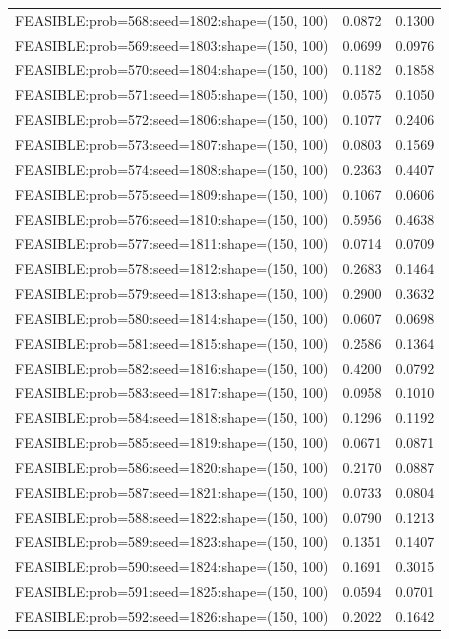 \begin{longtable}{lcc}
FEASIBLE:prob=568:seed=1802:shape=(150, 100) &   0.0872 & 0.1300 \\
FEASIBLE:prob=569:seed=1803:shape=(150, 100) &   0.0699 & 0.0976 \\
FEASIBLE:prob=570:seed=1804:shape=(150, 100) &   0.1182 & 0.1858 \\
FEASIBLE:prob=571:seed=1805:shape=(150, 100) &   0.0575 & 0.1050 \\
FEASIBLE:prob=572:seed=1806:shape=(150, 100) &   0.1077 & 0.2406 \\
FEASIBLE:prob=573:seed=1807:shape=(150, 100) &   0.0803 & 0.1569 \\
FEASIBLE:prob=574:seed=1808:shape=(150, 100) &   0.2363 & 0.4407 \\
FEASIBLE:prob=575:seed=1809:shape=(150, 100) &   0.1067 & 0.0606 \\
FEASIBLE:prob=576:seed=1810:shape=(150, 100) &   0.5956 & 0.4638 \\
FEASIBLE:prob=577:seed=1811:shape=(150, 100) &   0.0714 & 0.0709 \\
FEASIBLE:prob=578:seed=1812:shape=(150, 100) &   0.2683 & 0.1464 \\
FEASIBLE:prob=579:seed=1813:shape=(150, 100) &   0.2900 & 0.3632 \\
FEASIBLE:prob=580:seed=1814:shape=(150, 100) &   0.0607 & 0.0698 \\
FEASIBLE:prob=581:seed=1815:shape=(150, 100) &   0.2586 & 0.1364 \\
FEASIBLE:prob=582:seed=1816:shape=(150, 100) &   0.4200 & 0.0792 \\
FEASIBLE:prob=583:seed=1817:shape=(150, 100) &   0.0958 & 0.1010 \\
FEASIBLE:prob=584:seed=1818:shape=(150, 100) &   0.1296 & 0.1192 \\
FEASIBLE:prob=585:seed=1819:shape=(150, 100) &   0.0671 & 0.0871 \\
FEASIBLE:prob=586:seed=1820:shape=(150, 100) &   0.2170 & 0.0887 \\
FEASIBLE:prob=587:seed=1821:shape=(150, 100) &   0.0733 & 0.0804 \\
FEASIBLE:prob=588:seed=1822:shape=(150, 100) &   0.0790 & 0.1213 \\
FEASIBLE:prob=589:seed=1823:shape=(150, 100) &   0.1351 & 0.1407 \\
FEASIBLE:prob=590:seed=1824:shape=(150, 100) &   0.1691 & 0.3015 \\
FEASIBLE:prob=591:seed=1825:shape=(150, 100) &   0.0594 & 0.0701 \\
FEASIBLE:prob=592:seed=1826:shape=(150, 100) &   0.2022 & 0.1642 \\

\end{longtable}
